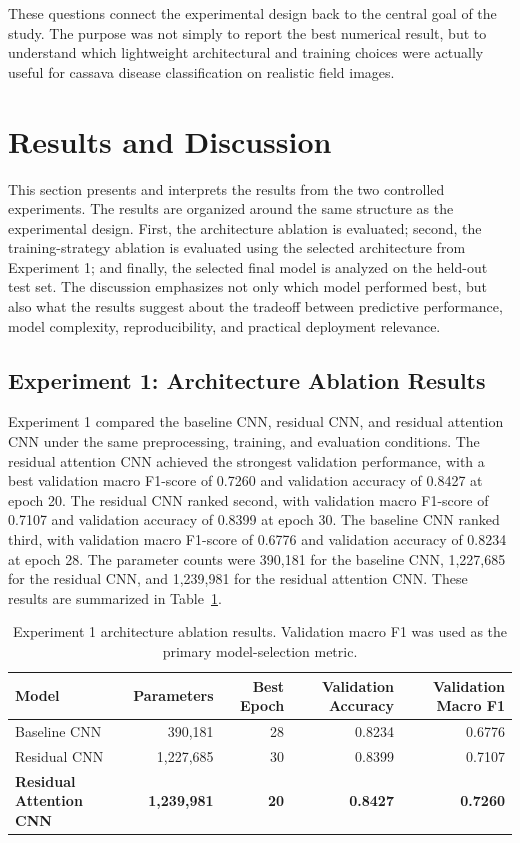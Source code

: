 \documentclass[11pt]{article}
\begin{document}
These questions connect the experimental design back to the central goal of the study. The purpose was not simply to report the best numerical result, but to understand which lightweight architectural and training choices were actually useful for cassava disease classification on realistic field images.


\section{Results and Discussion}

This section presents and interprets the results from the two controlled experiments. The results are organized around the same structure as the experimental design. First, the architecture ablation is evaluated; second, the training-strategy ablation is evaluated using the selected architecture from Experiment 1; and finally, the selected final model is analyzed on the held-out test set. The discussion emphasizes not only which model performed best, but also what the results suggest about the tradeoff between predictive performance, model complexity, reproducibility, and practical deployment relevance.

\subsection{Experiment 1: Architecture Ablation Results}

Experiment 1 compared the baseline CNN, residual CNN, and residual attention CNN under the same preprocessing, training, and evaluation conditions. The residual attention CNN achieved the strongest validation performance, with a best validation macro F1-score of 0.7260 and validation accuracy of 0.8427 at epoch 20. The residual CNN ranked second, with validation macro F1-score of 0.7107 and validation accuracy of 0.8399 at epoch 30. The baseline CNN ranked third, with validation macro F1-score of 0.6776 and validation accuracy of 0.8234 at epoch 28. The parameter counts were 390,181 for the baseline CNN, 1,227,685 for the residual CNN, and 1,239,981 for the residual attention CNN. These results are summarized in Table~\ref{tab:exp1_results}.

\begin{table}[htbp]
    \centering
    \caption{Experiment 1 architecture ablation results. Validation macro F1 was used as the primary model-selection metric.}
    \label{tab:exp1_results}
    \begin{tabular}{lrrrr}
        \toprule
        Model & Parameters & Best Epoch & Validation Accuracy & Validation Macro F1 \\
        \midrule
        Baseline CNN & 390,181 & 28 & 0.8234 & 0.6776 \\
        Residual CNN & 1,227,685 & 30 & 0.8399 & 0.7107 \\
        \textbf{Residual Attention CNN} & \textbf{1,239,981} & \textbf{20} & \textbf{0.8427} & \textbf{0.7260} \\
        \bottomrule
    \end{tabular}
\end{table}
\end{document}
